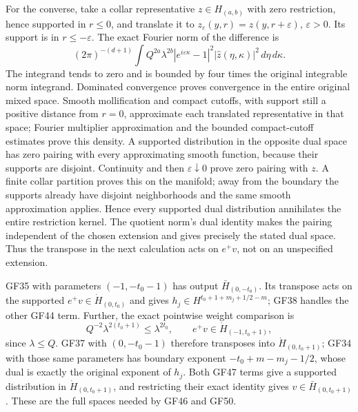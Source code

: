\documentclass[
  11pt,
]{article}
\begin{document}
For the converse, take a collar representative \(z\in H_{(a,b)}\) with
zero restriction, hence supported in \(r\leq0\), and translate it to
\(z_\varepsilon(y,r)=z(y,r+\varepsilon)\), \(\varepsilon>0\). Its
support is in \(r\leq-\varepsilon\). The exact Fourier norm of the
difference is \[
 (2\pi)^{-(d+1)}\int Q^{2a}\lambda^{2b}
       |e^{i\varepsilon\kappa}-1|^2|\widehat z(\eta,\kappa)|^2\,d\eta\,d\kappa.
 \tag{PC8a}
\] The integrand tends to zero and is bounded by four times the original
integrable norm integrand. Dominated convergence proves convergence in
the entire original mixed space. Smooth mollification and compact
cutoffs, with support still a positive distance from \(r=0\),
approximate each translated representative in that space; Fourier
multiplier approximation and the bounded compact-cutoff estimates prove
this density. A supported distribution in the opposite dual space has
zero pairing with every approximating smooth function, because their
supports are disjoint. Continuity and then \(\varepsilon\downarrow0\)
prove zero pairing with \(z\). A finite collar partition proves this on
the manifold; away from the boundary the supports already have disjoint
neighborhoods and the same smooth approximation applies. Hence every
supported dual distribution annihilates the entire restriction kernel.
The quotient norm's dual identity makes the pairing independent of the
chosen extension and gives precisely the stated dual space. Thus the
transpose in the next calculation acts on \(e^+v\), not on an
unspecified extension.

GF35 with parameters \((-1,-t_0-1)\) has output \(\bar H_{(0,-t_0)}\).
Its transpose acts on the supported \(e^+v\in\dot H_{(0,t_0)}\) and
gives \(h_j\in H^{t_0+1+m_j+1/2-m}\); GF38 handles the other GF44 term.
Further, the exact pointwise weight comparison is \[
 Q^{-2}\lambda^{2(t_0+1)}\leq\lambda^{2t_0},
 \qquad
 e^+v\in\dot H_{(-1,t_0+1)},
 \tag{PC8}
\] since \(\lambda\leq Q\). GF37 with \((0,-t_0-1)\) therefore
transposes into \(\dot H_{(0,t_0+1)}\); GF34 with those same parameters
has boundary exponent \(-t_0+m-m_j-1/2\), whose dual is exactly the
original exponent of \(h_j\). Both GF47 terms give a supported
distribution in \(\dot H_{(0,t_0+1)}\), and restricting their exact
identity gives \(v\in\bar H_{(0,t_0+1)}\). These are the full spaces
needed by GF46 and GF50.
\end{document}
